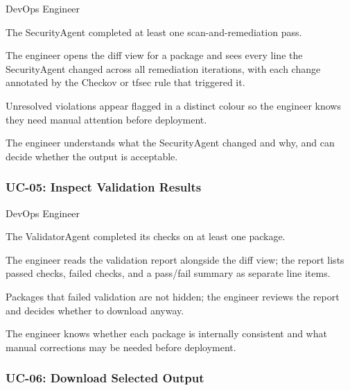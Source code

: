 \begin{description}[leftmargin=3.5cm, style=nextline]
  \item[Actor] DevOps Engineer
  \item[Precondition] The SecurityAgent completed at least one
    scan-and-remediation pass.
  \item[Main Flow] The engineer opens the diff view for a package and sees
    every line the SecurityAgent changed across all remediation iterations,
    with each change annotated by the Checkov or tfsec rule that triggered
    it.
  \item[Alternate Flow] Unresolved violations appear flagged in a distinct
    colour so the engineer knows they need manual attention before
    deployment.
  \item[Postcondition] The engineer understands what the SecurityAgent
    changed and why, and can decide whether the output is acceptable.
\end{description}

\subsubsection*{UC-05: Inspect Validation Results}

\begin{description}[leftmargin=3.5cm, style=nextline]
  \item[Actor] DevOps Engineer
  \item[Precondition] The ValidatorAgent completed its checks on at least
    one package.
  \item[Main Flow] The engineer reads the validation report alongside the
    diff view; the report lists passed checks, failed checks, and a
    pass/fail summary as separate line items.
  \item[Alternate Flow] Packages that failed validation are not hidden; the
    engineer reviews the report and decides whether to download anyway.
  \item[Postcondition] The engineer knows whether each package is internally
    consistent and what manual corrections may be needed before deployment.
\end{description}

\subsubsection*{UC-06: Download Selected Output}

